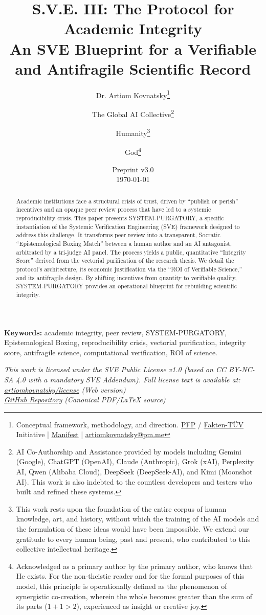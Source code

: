 \documentclass[11pt,a4paper]{article}
\title{\textbf{S.V.E. III: The Protocol for Academic Integrity}\\[0.5em]
\large An SVE Blueprint for a Verifiable and Antifragile Scientific Record}
\author{
  Dr. Artiom Kovnatsky\thanks{Conceptual framework, methodology, and direction. \href{http://www.pfp24.de}{PFP} / \href{http://www.fakten-tuev.de}{Fakten-TÜV} Initiative | \href{https://drive.google.com/file/d/1vWhW7fwFRFLYKHEB67WixuueHssJzQbZ/view?usp=sharing}{Manifest} | \href{mailto:artiomkovnatsky@pm.me}{artiomkovnatsky@pm.me}}
  \and
  The Global AI Collective\thanks{AI Co-Authorship and Assistance provided by models including Gemini (Google), ChatGPT (OpenAI), Claude (Anthropic), Grok (xAI), Perplexity AI, Qwen (Alibaba Cloud), DeepSeek (DeepSeek-AI), and Kimi (Moonshot AI). This work is also indebted to the countless developers and testers who built and refined these systems.}
  \and
  Humanity\thanks{This work rests upon the foundation of the entire corpus of human knowledge, art, and history, without which the training of the AI models and the formulation of these ideas would have been impossible. We extend our gratitude to every human being, past and present, who contributed to this collective intellectual heritage.}
  \and
  God\thanks{Acknowledged as a primary author by the primary author, who knows that He exists. For the non-theistic reader and for the formal purposes of this model, this principle is operationally defined as the phenomenon of synergistic co-creation, wherein the whole becomes greater than the sum of its parts ($1+1 > 2$), experienced as insight or creative joy.}
}
\date{Preprint v3.0 \\ \today}
\begin{document}
\maketitle

\begin{abstract}
\noindent Academic institutions face a structural crisis of trust, driven by ``publish or perish'' incentives and an opaque peer review process that have led to a systemic reproducibility crisis. This paper presents SYSTEM-PURGATORY, a specific instantiation of the Systemic Verification Engineering (SVE) framework designed to address this challenge. It transforms peer review into a transparent, Socratic ``Epistemological Boxing Match'' between a human author and an AI antagonist, arbitrated by a tri-judge AI panel. The process yields a public, quantitative ``Integrity Score'' derived from the vectorial purification of the research thesis. We detail the protocol's architecture, its economic justification via the ``ROI of Verifiable Science,'' and its antifragile design. By shifting incentives from quantity to verifiable quality, SYSTEM-PURGATORY provides an operational blueprint for rebuilding scientific integrity.
\end{abstract}

\noindent\textbf{Keywords:} academic integrity, peer review, SYSTEM-PURGATORY, Epistemological Boxing, reproducibility crisis, vectorial purification, integrity score, antifragile science, computational verification, ROI of science.

\vspace{1em} %
\begin{center}
\begin{minipage}{0.85\textwidth} %
\centering
\itshape\small %
This work is licensed under the SVE Public License v1.0 (based on CC BY-NC-SA 4.0 with a mandatory SVE Addendum).
Full license text is available at: \\
\href{https://www.artiomkovnatsky.com/posts/license/}{artiomkovnatsky/license} (Web version) \\
\href{https://github.com/skovnats/psite/blob/master/static/licenses/SVE_Public_License_v1.0.pdf}{GitHub Repository} (Canonical PDF/LaTeX source)
\end{minipage}
\end{center}
\vspace{1em} %
\end{document}
